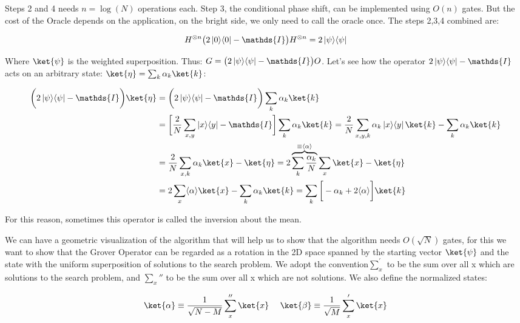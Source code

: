 Steps 2 and 4 needs $n=\log(N)$ operations each. Step 3, the conditional phase shift, can be implemented using $O(n)$ gates. But the cost of the Oracle depends on the application, on the bright side, we only need to call the oracle once. The steps 2,3,4 combined are: 

\begin{equation}
    H^{\otimes n} \big( 2 \op{0}{0} - \mathds{I} \big) H^{\otimes n} = 2 \op{\psi}{\psi} 
\end{equation}

Where $\ket{\psi}$ is the weighted superposition. Thus: $G = \big( 2\op{\psi}{\psi} - \mathds{I} \big) O $. Let's see how the operator $ 2\op{\psi}{\psi} - \mathds{I} $ acts on an arbitrary state: $\ket{\eta} = \sum_k \alpha_k \ket{k}$:

\begin{equation}
\begin{split}
    \bigg( 2\op{\psi}{\psi} - \mathds{I} \bigg) \ket{\eta} & = \bigg( 2\op{\psi}{\psi} - \mathds{I} \bigg) \sum_k \alpha_k \ket{k} \\ 
    & = \bigg[ \frac{2}{N} \sum_{x,y} \op{x}{y} - \mathds{I} \bigg] \sum_k \alpha_k \ket{k} = \frac{2}{N} \sum_{x,y,k} \alpha_k \op{x}{y} \ket{k} - \sum_k \alpha_k \ket{k} \\
    & = \frac{2}{N} \sum_{x,k} \alpha_k \ket{x} - \ket{\eta}  = 2 \overbrace{\sum_{k} \frac{\alpha_k}{N}}^{\equiv \langle \alpha \rangle} \sum_x \ket{x} - \ket{\eta} \\
    & = 2 \sum_x \langle \alpha \rangle \ket{x} - \sum_k \alpha_k \ket{k} = \sum_k \bigg[ - \alpha_k + 2 \langle \alpha \rangle \bigg] \ket{k}
\end{split}    
\end{equation}

For this reason, sometimes this operator is called the inversion about the mean.

We can have a geometric visualization of the algorithm that will help us to show that the algorithm needs $O(\sqrt{N})$ gates, for this we want to show that the Grover Operator can be regarded as a rotation in the 2D space spanned by the starting vector $\ket{\psi}$ and the state with the uniform superposition of solutions to the search problem. We adopt the convention$\sum_x^{'}$ to be the sum over all x which are solutions to the search problem, and $\sum_x''$ to be the sum over all x which are not solutions. We also define the normalized states:

\begin{equation}
    \ket{\alpha} \equiv \frac{1}{\sqrt{N-M}} \sum_x '' \ket{x} \ \ \ \ \ket{\beta} \equiv \frac{1}{\sqrt{M}} \sum_x ' \ket{x}
\end{equation}

